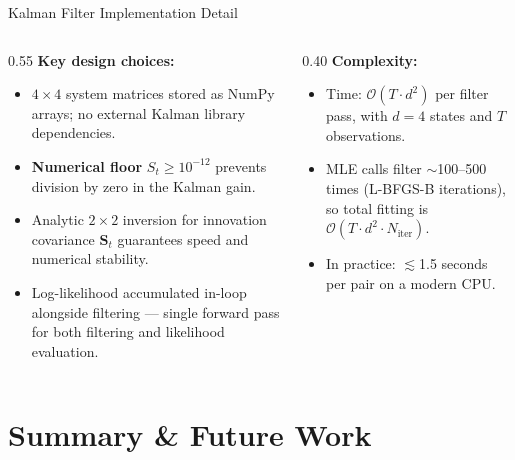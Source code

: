 \documentclass[10pt, aspectratio=169]{beamer}
\begin{document}
\begin{frame}{Kalman Filter Implementation Detail}
  \begin{columns}[T]
    \begin{column}{0.55\textwidth}
      \textbf{Key design choices:}
      \begin{itemize}
        \item $4 \times 4$ system matrices stored as NumPy arrays; no external
              Kalman library dependencies.
        \item \textbf{Numerical floor} $S_t \ge 10^{-12}$ prevents
              division by zero in the Kalman gain.
        \item Analytic $2 \times 2$ inversion for innovation covariance
              $\bm{S}_t$ guarantees speed and numerical stability.
        \item Log-likelihood accumulated in-loop alongside filtering ---
              single forward pass for both filtering and likelihood
              evaluation.
      \end{itemize}
    \end{column}
    \begin{column}{0.40\textwidth}
      \textbf{Complexity:}
      \begin{itemize}
        \item Time: $\mathcal{O}(T \cdot d^2)$ per filter pass, with $d=4$
              states and $T$ observations.
        \item MLE calls filter $\sim$100--500 times (L-BFGS-B iterations),
          so total fitting is $\mathcal{O}(T \cdot d^2 \cdot N_{\text{iter}})$.
        \item In practice: $\lesssim$1.5 seconds per pair on a modern CPU.
      \end{itemize}
    \end{column}
  \end{columns}
\end{frame}



\section{Summary \& Future Work}
\end{document}

